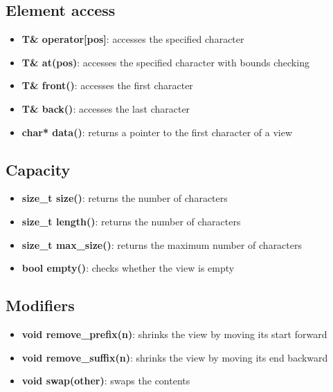 \documentclass{report}
\begin{document}
        \subsection{Element access}
        \begin{itemize}
            \item \textbf{T\& operator[pos]}: accesses the specified character
            \item \textbf{T\& at(pos)}: accesses the specified character with bounds checking
            \item \textbf{T\& front()}: accesses the first character
            \item \textbf{T\& back()}: accesses the last character
            \item \textbf{char* data()}: returns a pointer to the first character of a view
        \end{itemize}

        \bigbreak \noindent 
        \subsection{Capacity}
        \begin{itemize}
            \item \textbf{size_t size()}: returns the number of characters
            \item \textbf{size_t length()}: returns the number of characters
            \item \textbf{size_t max\_size()}: returns the maximum number of characters
            \item \textbf{bool empty()}: checks whether the view is empty
        \end{itemize}

        \bigbreak \noindent 
        \subsection{Modifiers}
        \begin{itemize}
            \item \textbf{void remove\_prefix(n)}: shrinks the view by moving its start forward
            \item \textbf{void remove\_suffix(n)}: shrinks the view by moving its end backward
            \item \textbf{void swap(other)}: swaps the contents
        \end{itemize}

        \bigbreak \noindent 
\end{document}
